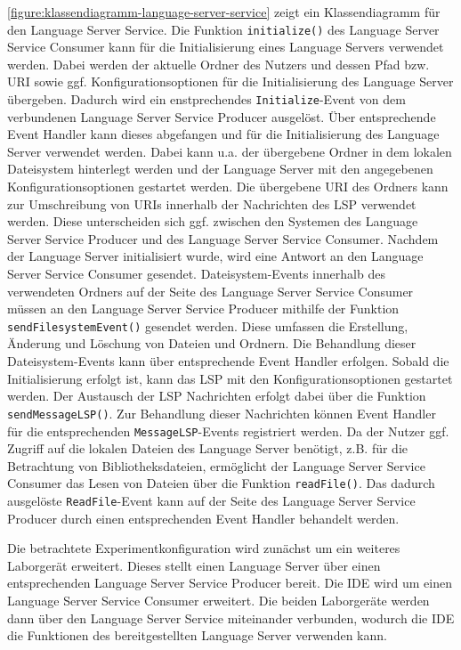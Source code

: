 \autoref{figure:klassendiagramm-language-server-service} zeigt ein Klassendiagramm für den Language Server Service. Die Funktion \texttt{initialize()} des Language Server Service Consumer kann für die Initialisierung eines Language Servers verwendet werden. Dabei werden der aktuelle Ordner des Nutzers und dessen Pfad bzw. URI sowie ggf. Konfigurationsoptionen für die Initialisierung des Language Server übergeben. Dadurch wird ein enstprechendes \texttt{Initialize}-Event von dem verbundenen Language Server Service Producer ausgelöst. Über entsprechende Event Handler kann dieses abgefangen und für die Initialisierung des Language Server verwendet werden. Dabei kann u.a. der übergebene Ordner in dem lokalen Dateisystem hinterlegt werden und der Language Server mit den angegebenen Konfigurationsoptionen gestartet werden. Die übergebene URI des Ordners kann zur Umschreibung von URIs innerhalb der Nachrichten des \ac{LSP} verwendet werden. Diese unterscheiden sich ggf. zwischen den Systemen des Language Server Service Producer und des Language Server Service Consumer. Nachdem der Language Server initialisiert wurde, wird eine Antwort an den Language Server Service Consumer gesendet. Dateisystem-Events innerhalb des verwendeten Ordners auf der Seite des Language Server Service Consumer müssen an den Language Server Service Producer mithilfe der Funktion \texttt{sendFilesystemEvent()} gesendet werden. Diese umfassen die Erstellung, Änderung und Löschung von Dateien und Ordnern. Die Behandlung dieser Dateisystem-Events kann über entsprechende Event Handler erfolgen. Sobald die Initialisierung erfolgt ist, kann das \ac{LSP} mit den Konfigurationsoptionen gestartet werden. Der Austausch der \ac{LSP} Nachrichten erfolgt dabei über die Funktion \texttt{sendMessageLSP()}. Zur Behandlung dieser Nachrichten können Event Handler für die entsprechenden \texttt{MessageLSP}-Events registriert werden. Da der Nutzer ggf. Zugriff auf die lokalen Dateien des Language Server benötigt, z.B. für die Betrachtung von Bibliotheksdateien, ermöglicht der Language Server Service Consumer das Lesen von Dateien über die Funktion \texttt{readFile()}. Das dadurch ausgelöste \texttt{ReadFile}-Event kann auf der Seite des Language Server Service Producer durch einen entsprechenden Event Handler behandelt werden.

Die betrachtete Experimentkonfiguration wird zunächst um ein weiteres Laborgerät erweitert. Dieses stellt einen Language Server über einen entsprechenden Language Server Service Producer bereit. Die IDE wird um einen Language Server Service Consumer erweitert. Die beiden Laborgeräte werden dann über den Language Server Service miteinander verbunden, wodurch die IDE die Funktionen des bereitgestellten Language Server verwenden kann.

